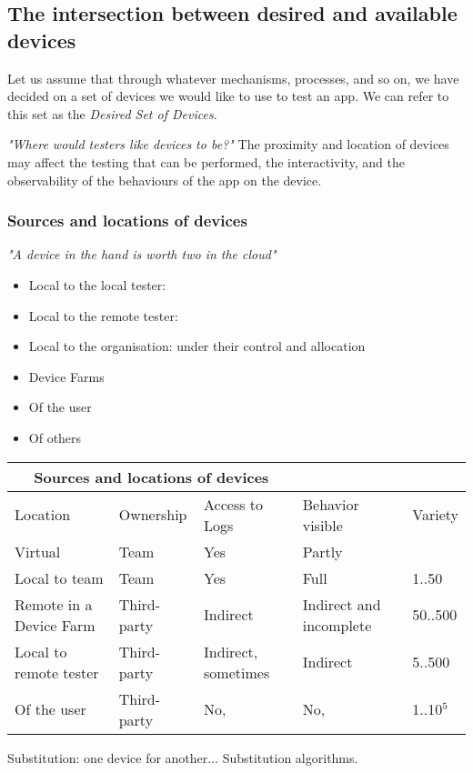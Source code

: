 \subsection{The intersection between desired and available devices}
Let us assume that through whatever mechanisms, processes, and so on, we have decided on a set of devices we would like to use to test an app. We can refer to this set as the  \textit{Desired Set of Devices}. 

\textit{"Where would testers like devices to be?"} The proximity and location of devices may affect the testing that can be performed, the interactivity, and the observability of the behaviours of the app on the device.

\subsubsection{Sources and locations of devices}
\textit{"A device in the hand is worth two in the cloud"}

\begin{itemize}
    \item Local to the local tester:
    \item Local to the remote tester: 
    \item Local to the organisation: under their control and allocation
    \item Device Farms
    \item Of the user
    \item Of others
\end{itemize}


\begin{tabular}{ | p{3cm} | p{1.5cm} | p{1.5cm} | p{1.5cm} | p{1.5cm}}
 \hline
 \multicolumn{3}{|c|}{Sources and locations of devices} \\
 \hline
 Location &Ownership &Access to Logs &Behavior visible &Variety\\
 \hline
 Virtual & Team &Yes &Partly &\< 10 \\
 Local to team & Team	&Yes &Full & 1..50\\
 Remote in a Device Farm	&Third-party &Indirect &Indirect and incomplete &50..500\\
 Local to remote tester	&Third-party &Indirect, sometimes &Indirect &5..500 \\
 Of the user &Third-party &No, &No, &1..10\(^5\) \\
 \hline
 \end{tabular}
 
 \vspace{1cm}


Substitution: one device for another... Substitution algorithms.


